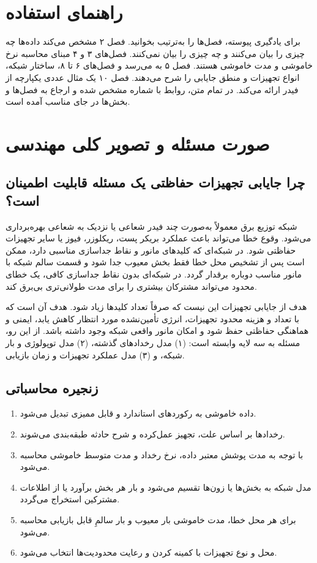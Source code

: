 \documentclass[11pt,a4paper,oneside]{book}
\newcommand{\code}[1]{\lr{\texttt{#1}}}
\begin{document}
\chapter*{راهنمای استفاده}
برای یادگیری پیوسته، فصل‌ها را به‌ترتیب بخوانید. فصل ۲ مشخص می‌کند داده‌ها چه چیزی را بیان می‌کنند و چه چیزی را بیان نمی‌کنند. فصل‌های ۳ و ۴ مبنای محاسبه نرخ خاموشی و مدت خاموشی هستند. فصل ۵ به  می‌رسد و فصل‌های ۶ تا ۸، ساختار شبکه، انواع تجهیزات و منطق جایابی را شرح می‌دهند. فصل ۱۰ یک مثال عددی یکپارچه از فیدر \code{F5} ارائه می‌کند. در تمام متن، روابط با شماره مشخص شده و ارجاع به فصل‌ها و بخش‌ها در جای مناسب آمده است.

\tableofcontents
\listoftables
\mainmatter

\chapter{صورت مسئله و تصویر کلی مهندسی}
\section{چرا جایابی تجهیزات حفاظتی یک مسئله قابلیت اطمینان است؟}
شبکه توزیع برق معمولاً به‌صورت چند فیدر شعاعی یا نزدیک به شعاعی بهره‌برداری می‌شود. وقوع خطا می‌تواند باعث عملکرد بریکر پست، ریکلوزر، فیوز یا سایر تجهیزات حفاظتی شود. در شبکه‌ای که کلیدهای مانور و نقاط جداسازی مناسبی دارد، ممکن است پس از تشخیص محل خطا فقط بخش معیوب جدا شود و قسمت سالم شبکه با مانور مناسب دوباره برقدار گردد. در شبکه‌ای بدون نقاط جداسازی کافی، یک خطای محدود می‌تواند مشترکان بیشتری را برای مدت طولانی‌تری بی‌برق کند.

هدف از جایابی تجهیزات این نیست که صرفاً تعداد کلیدها زیاد شود. هدف آن است که با تعداد و هزینه محدود تجهیزات، انرژی تأمین‌نشده مورد انتظار کاهش یابد، ایمنی و هماهنگی حفاظتی حفظ شود و امکان مانور واقعی شبکه وجود داشته باشد. از این رو، مسئله به سه لایه وابسته است: (۱) مدل رخدادهای گذشته، (۲) مدل توپولوژی و بار شبکه، و (۳) مدل عملکرد تجهیزات و زمان بازیابی.

\section{زنجیره محاسباتی}
\begin{enumerate}
\item داده خاموشی به رکوردهای استاندارد و قابل ممیزی تبدیل می‌شود.
\item رخدادها بر اساس علت، تجهیز عمل‌کرده و شرح حادثه طبقه‌بندی می‌شوند.
\item با توجه به مدت پوشش معتبر داده، نرخ رخداد و مدت متوسط خاموشی محاسبه می‌شود.
\item مدل شبکه به بخش‌ها یا زون‌ها تقسیم می‌شود و بار هر بخش برآورد یا از اطلاعات مشترکین استخراج می‌گردد.
\item برای هر محل خطا، مدت خاموشی بار معیوب و بار سالمِ قابل بازیابی محاسبه می‌شود.
\item محل و نوع تجهیزات با کمینه کردن  و رعایت محدودیت‌ها انتخاب می‌شود.
\end{enumerate}
\end{document}
